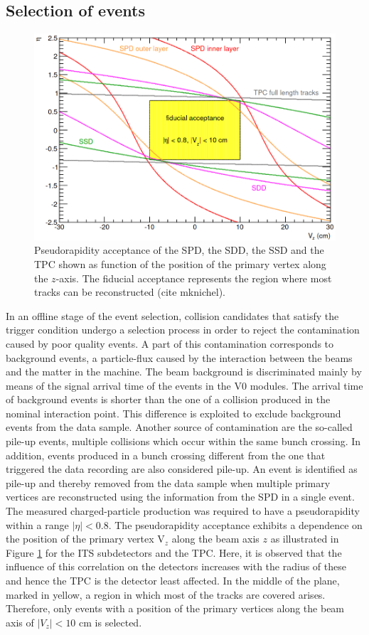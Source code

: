 \documentclass[12pt,a4paper]{report}
\begin{document}
\subsection{Selection of events}
\begin{figure}[tb!]
\centering
\includegraphics[width=12cm]{Plots/fiducialAcc.png}  
\caption{Pseudorapidity acceptance of the SPD, the SDD, the SSD and the TPC shown as function of the position of the primary vertex along the $z$-axis. The fiducial acceptance represents the region where most tracks can be reconstructed (cite mknichel).}
\label{fiducialAcc}
\end{figure}
In an offline stage of the event selection, collision candidates that satisfy the trigger condition undergo a selection process in order to reject the contamination caused by poor quality events. A part of this contamination corresponds to background events, a particle-flux caused by the interaction between the beams and the matter in the machine. The beam background is discriminated mainly by means of the signal arrival time of the events in the V0 modules. The arrival time of background events is shorter than the one of a collision produced in the nominal interaction point. This difference is exploited to exclude background events from the data sample. Another source of contamination are the so-called pile-up events, multiple collisions which occur within the same bunch crossing. In addition, events produced in a bunch crossing different from the one that triggered the data recording are also considered pile-up. An event is identified as pile-up and thereby removed from the data sample when multiple primary vertices are reconstructed using the information from the SPD in a single event.\\
The measured charged-particle production was required to have a pseudorapidity within a range $|\eta| < 0.8$. The pseudorapidity acceptance exhibits a dependence on the position of the primary vertex $\text{V}_z$ along the beam axis $z$ as illustrated in Figure \ref{fiducialAcc} for the ITS subdetectors and the TPC. Here, it is observed that the influence of this correlation on the detectors increases with the radius of these and hence the TPC is the detector least affected. In the middle of the plane, marked in yellow, a region in which most of the tracks are covered arises. Therefore, only events with a position of the primary vertices along the beam axis of $|V_z| < 10$ cm is selected. 
\end{document}
